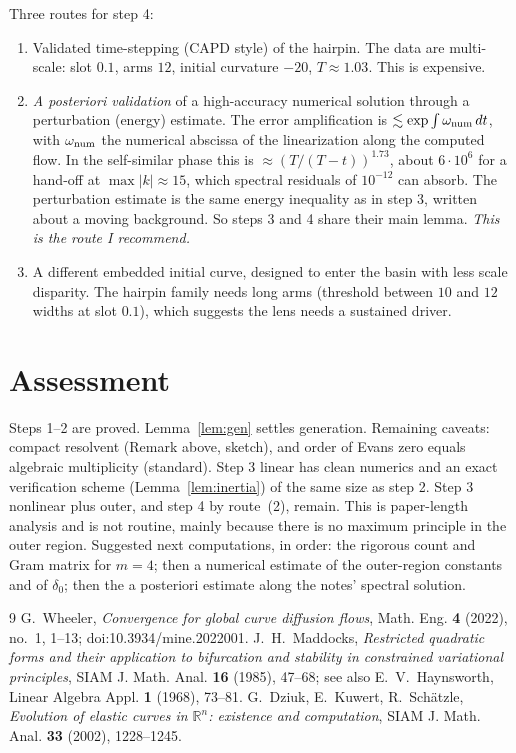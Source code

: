 \documentclass[11pt]{amsart}
\theoremstyle{remark}
\newcommand{\R}{\mathbb{R}}
\begin{document}
Three routes for step 4:
\begin{enumerate}
\item Validated time-stepping (CAPD style) of the hairpin. The data are multi-scale: slot $0.1$, arms $12$, initial curvature $-20$, $T\approx1.03$. This is expensive.
\item \emph{A posteriori validation} of a high-accuracy numerical solution through a perturbation (energy) estimate. The error amplification is $\lesssim\exp\int\omega_{\rm num}\,dt$, with $\omega_{\rm num}$ the numerical abscissa of the linearization along the computed flow. In the self-similar phase this is $\approx(T/(T-t))^{1.73}$, about $6\cdot10^6$ for a hand-off at $\max|k|\approx15$, which spectral residuals of $10^{-12}$ can absorb. The perturbation estimate is the same energy inequality as in step 3, written about a moving background. So steps 3 and 4 share their main lemma. \emph{This is the route I recommend.}
\item A different embedded initial curve, designed to enter the basin with less scale disparity. The hairpin family needs long arms (threshold between $10$ and $12$ widths at slot $0.1$), which suggests the lens needs a sustained driver.
\end{enumerate}

\section{Assessment}
Steps 1--2 are proved. Lemma~\ref{lem:gen} settles generation. Remaining caveats: compact resolvent (Remark above, sketch), and order of Evans zero equals algebraic multiplicity (standard). Step 3 linear has clean numerics and an exact verification scheme (Lemma~\ref{lem:inertia}) of the same size as step 2. Step 3 nonlinear plus outer, and step 4 by route~(2), remain. This is paper-length analysis and is not routine, mainly because there is no maximum principle in the outer region. Suggested next computations, in order: the rigorous count and Gram matrix for $m=4$; then a numerical estimate of the outer-region constants and of $\delta_0$; then the a posteriori estimate along the notes' spectral solution.

\begin{thebibliography}{9}
 G.~Wheeler, \emph{Convergence for global curve diffusion flows}, Math. Eng. \textbf{4} (2022), no.~1, 1--13; doi:10.3934/mine.2022001.
 J.~H.~Maddocks, \emph{Restricted quadratic forms and their application to bifurcation and stability in constrained variational principles}, SIAM J. Math. Anal. \textbf{16} (1985), 47--68; see also E.~V.~Haynsworth, Linear Algebra Appl. \textbf{1} (1968), 73--81.
 G.~Dziuk, E.~Kuwert, R.~Sch\"atzle, \emph{Evolution of elastic curves in $\R^n$: existence and computation}, SIAM J. Math. Anal. \textbf{33} (2002), 1228--1245.
\end{thebibliography}
\end{document}
